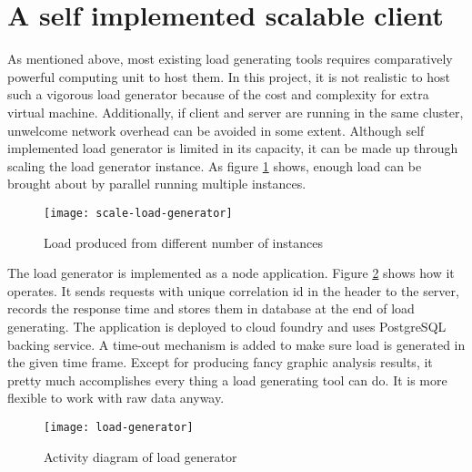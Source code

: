 \section{A self implemented scalable client}
	\label{scale-load-generator}
As mentioned above, most existing load generating tools requires comparatively powerful computing unit to host them. In this project, it is not realistic to host such a vigorous load generator because of the cost and complexity for extra virtual machine. Additionally, if client and server are running in the same cluster, unwelcome network overhead can be avoided in some extent. Although self implemented load generator is limited in its capacity, it can be made up through scaling the load generator instance. As figure  \ref{scale-load-generator} shows, enough load can be brought about by parallel running multiple instances.
\begin{figure}[h]
	\centering
	\texttt{[image: scale-load-generator]}
	\caption{Load produced from different number of instances}
	\label{scale-load-generator}
\end{figure}


The load generator is implemented as a node application. Figure \ref{load-generator} shows how it operates. It sends requests with unique correlation id in the header to the server, records the response time and stores them in database at the end of load generating. The application is deployed to cloud foundry and uses PostgreSQL backing service. A time-out mechanism is added to make sure load is generated in the given time frame. Except for producing fancy graphic analysis results, it pretty much accomplishes every thing a load generating tool can do. It is more flexible to work with raw data anyway.

 \begin{figure}[h]
	\centering
	\texttt{[image: load-generator]}
	\caption{Activity diagram of load generator}
	\label{load-generator}
\end{figure}

